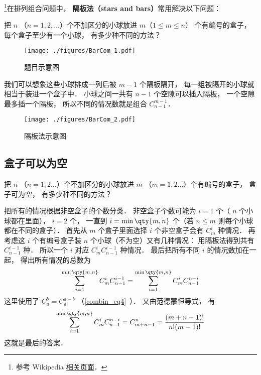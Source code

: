 


\footnote{参考 Wikipedia \href{https://en.wikipedia.org/wiki/Stars_and_bars_(combinatorics)}{相关页面}．}在排列组合问题中， \textbf{隔板法（stars and bars）}常用解决以下问题：

\begin{example}{}
把 $n$ （$n = 1,2,\dots$）个不加区分的小球放进 $m$（$1\leqslant m\leqslant n$） 个有编号的盒子， 每个盒子至少有一个小球， 有多少种不同的方法？
\begin{figure}[ht]
\centering
\texttt{[image: ./figures/BarCom\_1.pdf]}
\caption{题目示意图} \label{BarCom_fig1}
\end{figure}
\end{example}

我们可以想象这些小球排成一列后被 $m-1$ 个隔板隔开， 每一组被隔开的小球就相当于装进一个盒子中． 小球之间一共有 $n-1$ 个空隙可以插入隔板， 一个空隙最多插一个隔板， 所以不同的情况数就是组合 $C_{n-1}^{m-1}$．
\begin{figure}[ht]
\centering
\texttt{[image: ./figures/BarCom\_2.pdf]}
\caption{隔板法示意图} \label{BarCom_fig2}
\end{figure}
\subsection{盒子可以为空}


\begin{example}{}
把 $n$ （$n=1,2\dots$）个不加区分的小球放进 $m$ （$m=1,2\dots$）个有编号的盒子， 盒子可为空， 有多少种不同的方法？
\end{example}

把所有的情况根据非空盒子的个数分类． 非空盒子个数可能为 $i=1$ 个（ $n$ 个小球都在里面）， $i=2$ 个， 一直到 $i=\min\qty{m,n}$ 个（若 $n\leqslant m$ 则每个小球都在不同的盒子）． 首先从 $m$ 个盒子里面选择 $i$ 个非空盒子会有 $C_m^i$ 种情况． 再考虑这 $i$ 个有编号盒子装 $n$ 个小球（不为空）又有几种情况： 用隔板法得到共有 $C_{n-1}^{i-1}$ 种． 所以一个 $i$ 对应 $C_m^i C_{n-1}^{i-1}$ 种情况． 最后把所有不同 $i$ 的情况数加在一起， 得出所有情况的总数为
\begin{equation}
\sum_{i = 1}^{\min\qty{m,n}} C_m^i C_{n-1}^{i-1} = \sum_{i=1}^{\min\qty{m,n}}  C_m^i C_{n-1}^{n-i}
\end{equation}
这里使用了 $C_a^b = C_a^{a-b}$ （\autoref{combin_eq4}~）． 又由范德蒙恒等式， 有
\begin{equation}
\sum_{i=1}^{\min\qty{m,n}}  C_m^i C_{n-1}^{n-i} = C_{m+n-1}^n = \frac{(m+n-1)!}{n!(m - 1)!}
\end{equation}
这就是最后的答案．
